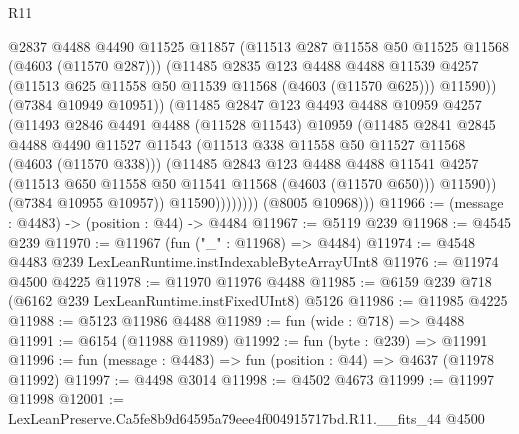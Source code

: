 \begin{lexlean}{R11}
\begin{coremodule}
                          @2837
                          @4488
                          @4490
                          @11525
                          @11857
                          (@11513 @287 @11558 @50 @11525 @11568 (@4603 (@11570 @287)))
                          (@11485
                            @2835
                            @123
                            @4488
                            @4488
                            @11539
                            @4257
                            (@11513 @625 @11558 @50 @11539 @11568 (@4603 (@11570 @625)))
                            @11590))
                        (@7384 @10949 @10951))
                      (@11485
                        @2847
                        @123
                        @4493
                        @4488
                        @10959
                        @4257
                        (@11493
                          @2846
                          @4491
                          @4488
                          (@11528 @11543)
                          @10959
                          (@11485
                            @2841
                            @2845
                            @4488
                            @4490
                            @11527
                            @11543
                            (@11513 @338 @11558 @50 @11527 @11568 (@4603 (@11570 @338)))
                            (@11485
                              @2843
                              @123
                              @4488
                              @4488
                              @11541
                              @4257
                              (@11513 @650 @11558 @50 @11541 @11568 (@4603 (@11570 @650)))
                              @11590))
                          (@7384 @10955 @10957))
                        @11590))))))))
        (@8005 @10968)))
@11966 := (message : @4483) -> (position : @44) -> @4484
@11967 := @5119 @239
@11968 := @4545 @239
@11970 := @11967 (fun ("_" : @11968) => @4484)
@11974 := @4548 @4483 @239 LexLeanRuntime.instIndexableByteArrayUInt8
@11976 := @11974 @4500 @4225
@11978 := @11970 @11976 @4488
@11985 := @6159 @239 @718 (@6162 @239 LexLeanRuntime.instFixedUInt8) @5126
@11986 := @11985 @4225
@11988 := @5123 @11986 @4488
@11989 := fun (wide : @718) => @4488
@11991 := @6154 (@11988 @11989)
@11992 := fun (byte : @239) => @11991
@11996 := fun (message : @4483) => fun (position : @44) => @4637 (@11978 @11992)
@11997 := @4498 @3014
@11998 := @4502 @4673
@11999 := @11997 @11998
@12001 := LexLeanPreserve.Ca5fe8b9d64595a79eee4f004915717bd.R11.__fits_44 @4500

\end{coremodule}
\end{lexlean}
